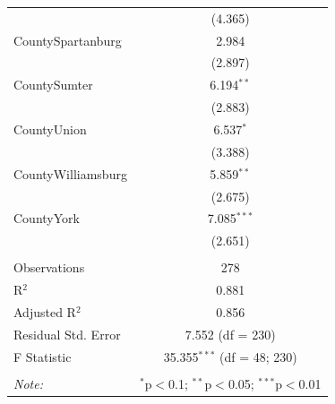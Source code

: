 \documentclass[11pt, oneside]{article}   	%
\theoremstyle{ModifiedStyle}
\begin{document}
\begin{table}[H]
\begin{tabular}{@{\extracolsep{5pt}}lc}
			& (4.365) \\
			CountySpartanburg & 2.984 \\
			& (2.897) \\
			CountySumter & 6.194$^{**}$ \\
			& (2.883) \\
			CountyUnion & 6.537$^{*}$ \\
			& (3.388) \\
			CountyWilliamsburg & 5.859$^{**}$ \\
			& (2.675) \\
			CountyYork & 7.085$^{***}$ \\
			& (2.651) \\
		 \hline \\[-1.8ex]
			Observations & 278 \\
			R$^{2}$ & 0.881 \\
			Adjusted R$^{2}$ & 0.856 \\
			Residual Std. Error & 7.552 (df = 230) \\
			F Statistic & 35.355$^{***}$ (df = 48; 230) \\
			\hline
			\hline \\[-1.8ex]
			\textit{Note:}  & \multicolumn{1}{r}{$^{*}$p$<$0.1; $^{**}$p$<$0.05; $^{***}$p$<$0.01} \\
			\end{tabular}
		\end{table}
\end{document}
